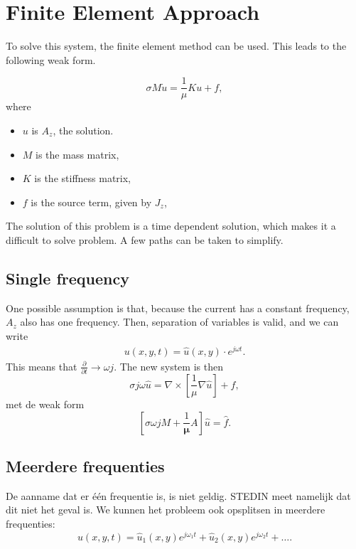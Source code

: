 \documentclass[11pt]{report}
\begin{document}
\newpage
\section{Finite Element Approach}
To solve this system, the finite element method can be used. This leads to the following weak form.
\begin{weakform}
    \begin{equation*}
        \sigma M \dot u = \frac{1}{\mu}K u + f,
    \end{equation*}
    where
    \begin{itemize}
        \item $u$ is $A_z$, the solution.
        \item $M$ is the mass matrix,
        \item $K$ is the stiffness matrix,
        \item $f$ is the source term, given by $J_z$,
    \end{itemize}
\end{weakform}
The solution of this problem is a time dependent solution, which makes it a difficult to solve problem. A few paths can be taken to simplify.


\subsection{Single frequency}
One possible assumption is that, because the current has a constant frequency, $A_z$ also has one frequency. Then, separation of variables is valid, and we can write
\begin{align*}
    u(x,y,t) = \hat u(x,y) \cdot e^{j\omega t}.
\end{align*}
This means that $\frac{\partial}{\partial t} \to \omega j$. The new system is then
\begin{equation}
    \sigma j \omega \hat u = \nabla \times \left[\frac{1}{\mu}\nabla \hat u\right] + f,
\end{equation}
met de weak form
\begin{equation*}
    \left[\sigma \omega j M + \frac{1}{\mathbf \mu}A\right]\hat u = \hat f.
\end{equation*}

\subsection{Meerdere frequenties}
De aanname dat er één frequentie is, is niet geldig. STEDIN meet namelijk dat dit niet het geval is. We kunnen het probleem ook opsplitsen in meerdere frequenties:
\begin{equation}
    u(x,y,t) = \hat u_1(x,y) e^{j\omega_1 t} + \hat u_2(x,y) e^{j\omega_2 t} + \dots.
\end{equation}
\end{document}
